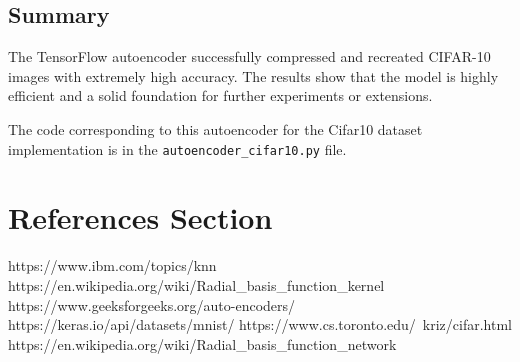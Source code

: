 \documentclass[lettersize,journal]{IEEEtran}
\begin{document}
\subsection{\textbf{Summary}}
The TensorFlow autoencoder successfully compressed and recreated CIFAR-10 images with extremely high accuracy. The results show that the model is highly efficient and a solid foundation for further experiments or extensions.

The code corresponding to this autoencoder for the Cifar10 dataset implementation is in the \texttt{autoencoder\_cifar10.py} file.

\section{\textbf{References Section}}
\begin{thebibliography}{1}

https://www.ibm.com/topics/knn
https://en.wikipedia.org/wiki/Radial\_basis\_function\_kernel
https://www.geeksforgeeks.org/auto-encoders/
https://keras.io/api/datasets/mnist/
https://www.cs.toronto.edu/~kriz/cifar.html
https://en.wikipedia.org/wiki/Radial\_basis\_function\_network
\end{thebibliography}
\end{document}
